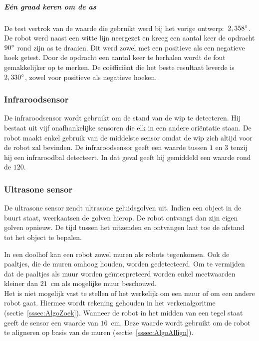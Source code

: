 \documentclass[eind]{penoverslag}
\begin{document}

\subparagraph{E\'en graad keren om de as}
De test vertrok van de waarde die gebruikt werd bij het vorige ontwerp:~$2,358\degree$. De robot werd naast een witte lijn neergezet en kreeg een aantal keer de opdracht $90\degree$ rond zijn as te draaien. Dit werd zowel met een positieve als een negatieve hoek getest. Door de opdracht een aantal keer te herhalen wordt de fout gemakkelijker op te merken.
De co\"effici\"ent die het beste resultaat leverde is $2,330\degree$, zowel voor positieve als negatieve hoeken.



\subsubsection{Infraroodsensor}
De infraroodsensor wordt gebruikt om de stand van de wip te detecteren. Hij bestaat uit vijf onafhankelijke sensoren die elk in een andere ori\"entatie staan. De robot maakt enkel gebruik van de middelste sensor omdat de wip zich altijd voor de robot zal bevinden. De infraroodsensor geeft een waarde tussen $1$ en $3$ tenzij hij een infraroodbal detecteert. In dat geval geeft hij gemiddeld een waarde rond de $120$.

\subsubsection{Ultrasone sensor}
De ultrasone sensor zendt ultrasone geluidsgolven uit. Indien een object in de buurt staat, weerkaatsen de golven hierop. De robot ontvangt dan zijn eigen golven opnieuw. De tijd tussen het uitzenden en ontvangen laat toe de afstand tot het object te bepalen.

In een doolhof kan een robot zowel muren als robots tegenkomen. Ook de paaltjes, die de muren omhoog houden, worden gedetecteerd. Om te vermijden dat de paaltjes als muur worden ge\"interpreteerd worden enkel meetwaarden kleiner dan $21$~cm als mogelijke muur beschouwd.\\ Het is niet mogelijk vast te stellen of het werkelijk om een muur of om een andere robot gaat. Hiermee wordt rekening gehouden in het verkenalgoritme (sectie~\ref{sssec:AlgoZoek}). Wanneer de robot in het midden van een tegel staat geeft de sensor een waarde van $16$~cm. Deze waarde wordt gebruikt om de robot te aligneren op basis van de muren (sectie~\ref{sssec:AlgoAllign}).
\end{document}
